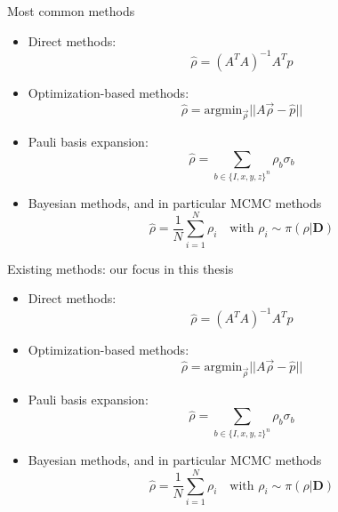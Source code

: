 \documentclass{beamer}
\newcommand{\mb}{\mathbf}
\newcommand{\semitransp}[2][35]{\textcolor{fg!#1}{#2}}
\begin{document}
\begin{frame}{Most common methods}
    \begin{itemize}
        \item Direct methods: \begin{equation}
            \hat \rho = (A^TA)^{-1}A^T \hat p
        \end{equation}
        \item Optimization-based methods: \begin{equation}
            \hat \rho = \text{argmin}_{\vec\rho} ||A \vec\rho - \hat p||
        \end{equation} 
        \item Pauli basis expansion:\begin{equation}
            \hat \rho = \sum_{b\in\{I,x,y,z\}^n} \rho_b \sigma_b
        \end{equation}
        \item Bayesian methods, and in particular MCMC methods
        \begin{equation}
        \hat \rho = \frac{1}{N}\sum_{i=1}^N \rho_i \quad \text{with } \rho_i \sim \pi(\rho|\mb D)
        \end{equation}
    \end{itemize}
\end{frame}
\begin{frame}{Existing methods: our focus in this thesis}
    \begin{itemize}
        \item<0> Direct methods: \begin{equation}
            \hat \rho = (A^TA)^{-1}A^T \hat p
        \end{equation}
        \item<0> Optimization-based methods: \begin{equation}
            \hat \rho = \text{argmin}_{\vec\rho} ||A \vec\rho - \hat p||
        \end{equation} 
        \item<0> Pauli basis expansion:
        \begin{equation}
            \hat \rho = \sum_{b\in\{I,x,y,z\}^n} \rho_b \sigma_b
        \end{equation}
        \item<1> Bayesian methods, and in particular MCMC methods
        \begin{equation}
        \hat \rho = \frac{1}{N}\sum_{i=1}^N \rho_i \quad \text{with } \rho_i \sim \pi(\rho|\mb D)
        \end{equation}
    \end{itemize}
\end{frame}
\end{document}
